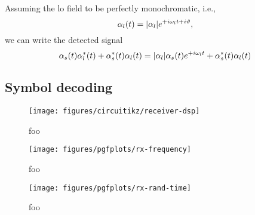 

Assuming the \gls{lo} field to be perfectly monochromatic, i.e.,
\begin{equation}
	\alpha_l(t)
	=
	\lvert\alpha_l\rvert
	e^{+i\omega_lt+i\vartheta}
	,
\end{equation}
we can write the detected signal
\begin{equation}
	\alpha_s(t)
	\alpha_l^*(t)
	+
	\alpha_s^*(t)
	\alpha_l(t)
	=
	\lvert\alpha_l\rvert
	\alpha_s(t)
	e^{+i\omega_l t}
	+
	\alpha_s^*(t)
	\alpha_l(t)	
\end{equation}

\FloatBarrier
\subsection{Symbol decoding}

\begin{figure}[htb]
	\centering
	\texttt{[image: figures/circuitikz/receiver-dsp]}
	\caption{foo}
\end{figure}

\begin{figure}[htb]
	\centering
	\texttt{[image: figures/pgfplots/rx-frequency]}
	\caption{foo}
\end{figure}

\begin{figure}[htb]
	\centering
	\texttt{[image: figures/pgfplots/rx-rand-time]}
	\caption{foo}
\end{figure}